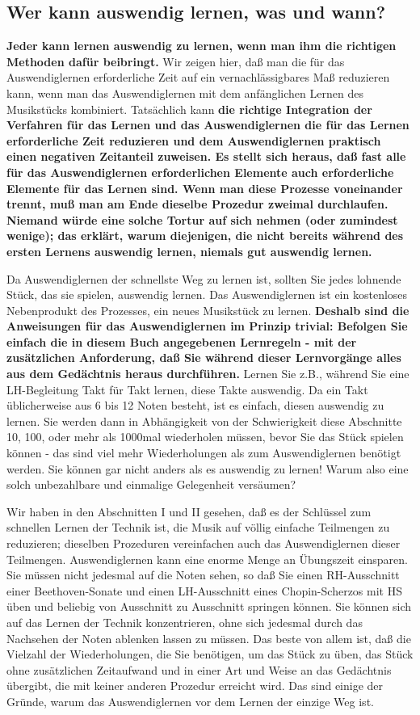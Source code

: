 \subsection{Wer kann auswendig lernen, was und wann?}
\label{c1iii6b}

\textbf{Jeder kann lernen auswendig zu lernen, wenn man ihm die richtigen Methoden dafür beibringt.}
Wir zeigen hier, daß man die für das Auswendiglernen erforderliche Zeit auf ein vernachlässigbares Maß reduzieren kann, wenn man das Auswendiglernen mit dem anfänglichen Lernen des Musikstücks kombiniert.
Tatsächlich kann \textbf{die richtige Integration der Verfahren für das Lernen und das Auswendiglernen die für das Lernen erforderliche Zeit reduzieren und dem Auswendiglernen praktisch einen negativen Zeitanteil zuweisen.
Es stellt sich heraus, daß fast alle für das Auswendiglernen erforderlichen Elemente auch erforderliche Elemente für das Lernen sind.
Wenn man diese Prozesse voneinander trennt, muß man am Ende dieselbe Prozedur zweimal durchlaufen.
Niemand würde eine solche Tortur auf sich nehmen (oder zumindest wenige); das erklärt, warum diejenigen, die nicht bereits während des ersten Lernens auswendig lernen, niemals gut auswendig lernen.}

Da Auswendiglernen der schnellste Weg zu lernen ist, sollten Sie jedes lohnende Stück, das sie spielen, auswendig lernen.
Das Auswendiglernen ist ein kostenloses Nebenprodukt des Prozesses, ein neues Musikstück zu lernen.
\textbf{Deshalb sind die Anweisungen für das Auswendiglernen im Prinzip trivial: Befolgen Sie einfach die in diesem Buch angegebenen Lernregeln - mit der zusätzlichen Anforderung, daß Sie während dieser Lernvorgänge alles aus dem Gedächtnis heraus durchführen.}
Lernen Sie z.B., während Sie eine LH-Begleitung Takt für Takt lernen, diese Takte auswendig.
Da ein Takt üblicherweise aus 6 bis 12 Noten besteht, ist es einfach, diesen auswendig zu lernen.
Sie werden dann in Abhängigkeit von der Schwierigkeit diese Abschnitte 10, 100, oder mehr als 1000mal wiederholen müssen, bevor Sie das Stück spielen können - das sind viel mehr Wiederholungen als zum Auswendiglernen benötigt werden.
Sie können gar nicht anders als es auswendig zu lernen!
Warum also eine solch unbezahlbare und einmalige Gelegenheit versäumen?

Wir haben in den Abschnitten I und II gesehen, daß es der Schlüssel zum schnellen Lernen der Technik ist, die Musik auf völlig einfache Teilmengen zu reduzieren; dieselben Prozeduren vereinfachen auch das Auswendiglernen dieser Teilmengen.
Auswendiglernen kann eine enorme Menge an Übungszeit einsparen.
Sie müssen nicht jedesmal auf die Noten sehen, so daß Sie einen RH-Ausschnitt einer Beethoven-Sonate und einen LH-Ausschnitt eines Chopin-Scherzos mit HS üben und beliebig von Ausschnitt zu Ausschnitt springen können.
Sie können sich auf das Lernen der Technik konzentrieren, ohne sich jedesmal durch das Nachsehen der Noten ablenken lassen zu müssen.
Das beste von allem ist, daß die Vielzahl der Wiederholungen, die Sie benötigen, um das Stück zu üben, das Stück ohne zusätzlichen Zeitaufwand und in einer Art und Weise an das Gedächtnis übergibt, die mit keiner anderen Prozedur erreicht wird.
Das sind einige der Gründe, warum das Auswendiglernen vor dem Lernen der einzige Weg ist.

